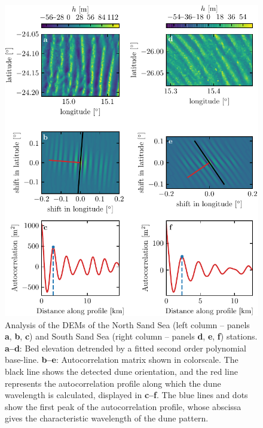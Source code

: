 \begin{figure}[p]
  \centering
  \includegraphics[scale=1]{Figures/Figure4_supp.pdf}
  \caption{Analysis of the DEMs of the North Sand Sea (left column -- panels \textbf{a}, \textbf{b}, \textbf{c}) and South Sand Sea (right column -- panels \textbf{d}, \textbf{e}, \textbf{f}) stations. \textbf{a--d}: Bed elevation detrended by a fitted second order polynomial base-line. \textbf{b--e}: Autocorrelation matrix shown in colorscale. The black line shows the detected dune orientation, and the red line represents the autocorrelation profile along which the dune wavelength is calculated, displayed in \textbf{c--f}. The blue lines and dots show the first peak of the autocorrelation profile, whose abscissa gives the characteristic wavelength of the dune pattern.}
  \label{Fig4_supp}
\end{figure}

